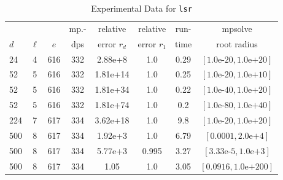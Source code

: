 \documentclass[runningheads]{llncs}
\begin{document}
\begin{table}
\caption{Experimental Data for \texttt{lsr}} %
\label{tab:lsr}
\vskip -0.15in
\begin{center}
\begin{small}
\begin{sc}
\begin{tabular}{lccccccc}
\toprule
&  &  & mp.-& relative  & relative & run- & mpsolve \\
$d$& $\ell$& $e$ & dps&error $r_d$       & error $r_1$ &time& root radius\\
\midrule
 24 & 4 & 616 & 332 & 2.88e+8 & 1.0 & 0.29 & $[1.0\text{e-}20, 1.0\text{e+}20]$\\
 52 & 5 & 616 & 332 & 1.81e+14 & 1.0 & 0.25 & $[1.0\text{e-}20, 1.0\text{e+}10]$\\ %
 52 & 5 & 616 & 332 & 1.81e+34 & 1.0 & 0.22 & $[1.0\text{e-}40, 1.0\text{e+}20]$\\ %
 52 & 5 & 616 & 332 & 1.81e+74 & 1.0 & 0.2 & $[1.0\text{e-}80, 1.0\text{e+}40]$\\ %
 224 & 7 & 617 & 334 & 3.62e+18 & 1.0 & 9.8 & $[1.0\text{e-}20, 1.0\text{e+}20]$\\
 500 & 8 & 617 & 334 & 1.92e+3 & 1.0 & 6.79 & $[0.0001, 2.0\text{e+}4]$\\
 500 & 8 & 617 & 334 & 5.77e+3 & 0.995 & 3.27 & $[3.33\text{e-}5, 1.0\text{e+}3]$\\
 500 & 8 & 617 & 334 & 1.05 & 1.0 & 3.05 & $[0.0916, 1.0\text{e+}200]$\\
\bottomrule
\end{tabular}
\end{sc}
\end{small}
\end{center}
\vskip 0.05in
\end{table}
\end{document}
